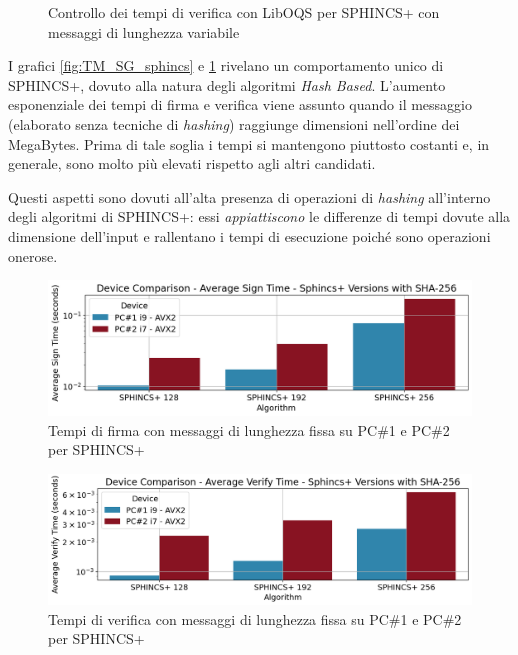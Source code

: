 \begin{figure}[H]
\begin{minipage}{0.45\textwidth}
        \caption{Controllo dei tempi di verifica con LibOQS per SPHINCS+ con messaggi di lunghezza variabile}
        \label{fig:TM_VF_sphincs}
    \end{minipage}
\end{figure}

I grafici \ref{fig:TM_SG_sphincs} e \ref{fig:TM_VF_sphincs} rivelano un comportamento unico di SPHINCS+, dovuto alla natura degli algoritmi \textit{Hash Based}. L'aumento esponenziale dei tempi di firma e verifica viene assunto quando il messaggio (elaborato senza tecniche di \textit{hashing}) raggiunge dimensioni nell'ordine dei MegaBytes. Prima di tale soglia i tempi si mantengono piuttosto costanti e, in generale, sono molto più elevati rispetto agli altri candidati.

Questi aspetti sono dovuti all'alta presenza di operazioni di \textit{hashing} all'interno degli algoritmi di SPHINCS+: essi \textit{appiattiscono} le differenze di tempi dovute alla dimensione dell'input e rallentano i tempi di esecuzione poiché sono operazioni onerose.

\begin{figure}[H]
    \centering
    \includegraphics[width=1\textwidth]{Immagini/comparison/Time_Sign/TM_SG_H_sphincs_sha256.png}
    \caption{Tempi di firma con messaggi di lunghezza fissa su PC\#1 e PC\#2 per SPHINCS+}
    \label{fig:TM_SG_H_sphincs_sha256}
\end{figure}

\begin{figure}[H]
    \centering
    \includegraphics[width=1\textwidth]{Immagini/comparison/Time_Verify/TM_VF_H_sphincs_sha256.png}
    \caption{Tempi di verifica con messaggi di lunghezza fissa su PC\#1 e PC\#2 per SPHINCS+}
    \label{fig:TM_VF_H_sphincs_sha256}
\end{figure}

